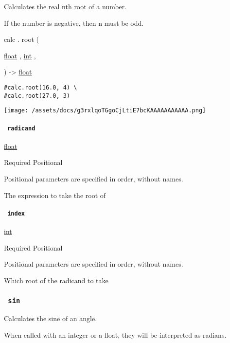 Calculates the real nth root of a number.

If the number is negative, then n must be odd.

calc { . } { root } (

{ \href{/docs/reference/foundations/float/}{float} , } {
\href{/docs/reference/foundations/int/}{int} , }

) -\textgreater{} \href{/docs/reference/foundations/float/}{float}

\begin{verbatim}
#calc.root(16.0, 4) \
#calc.root(27.0, 3)
\end{verbatim}

\texttt{[image: /assets/docs/g3rxlqoTGgoCjLtiE7bcKAAAAAAAAAAA.png]}

\paragraph{\texorpdfstring{\texttt{\ radicand\ }}{ radicand }}\label{functions-root-radicand}

\href{/docs/reference/foundations/float/}{float}

{Required} {{ Positional }}

\label{functions-root-radicand-positional-tooltip}
Positional parameters are specified in order, without names.

The expression to take the root of

\paragraph{\texorpdfstring{\texttt{\ index\ }}{ index }}\label{functions-root-index}

\href{/docs/reference/foundations/int/}{int}

{Required} {{ Positional }}

\label{functions-root-index-positional-tooltip}
Positional parameters are specified in order, without names.

Which root of the radicand to take

\subsubsection{\texorpdfstring{\texttt{\ sin\ }}{ sin }}\label{functions-sin}

Calculates the sine of an angle.

When called with an integer or a float, they will be interpreted as
radians.


